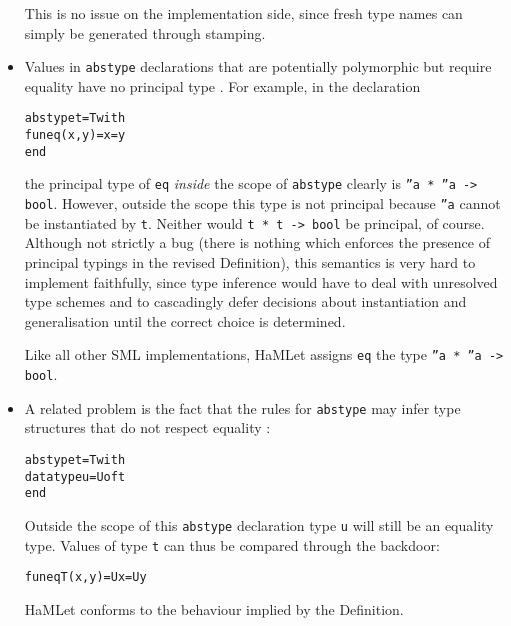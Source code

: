 \documentclass[twoside,titlepage]{article}
\begin{document}
\begin{appendix}
\begin{itemize}
This is no issue on the implementation side, since fresh type names can simply be generated through stamping.

\item Values in {\tt abstype} declarations that are potentially polymorphic but require equality have no principal type \cite{addenda}. For example, in the declaration

\begin{quoting}
\begin{alltt}
abstype t = T with
  fun eq(x, y) = x = y
end
\end{alltt}
\end{quoting}

the principal type of {\tt eq} {\em inside} the scope of {\tt abstype} clearly is {\tt ''a * ''a -> bool}. However, outside the scope this type is not principal because {\tt ''a} cannot be instantiated by {\tt t}. Neither would {\tt t * t -> bool} be principal, of course. Although not strictly a bug (there is nothing which enforces the presence of principal typings in the revised Definition), this semantics is very hard to implement faithfully, since type inference would have to deal with unresolved type schemes and to cascadingly defer decisions about instantiation and generalisation until the correct choice is determined.

Like all other SML implementations, HaMLet assigns {\tt eq} the type {\tt ''a * ''a -> bool}.

\item A related problem is the fact that the rules for {\tt abstype} may infer type structures that do not respect equality \cite{addenda}:

\begin{quoting}
\begin{alltt}
abstype t = T with
  datatype u = U of t
end
\end{alltt}
\end{quoting}

Outside the scope of this {\tt abstype} declaration type {\tt u} will still be an equality type. Values of type {\tt t} can thus be compared through the backdoor:

\begin{quoting}
\begin{alltt}
fun eqT(x, y) = U x = U y
\end{alltt}
\end{quoting}

HaMLet conforms to the behaviour implied by the Definition.


\end{itemize}
\end{appendix}
\end{document}
